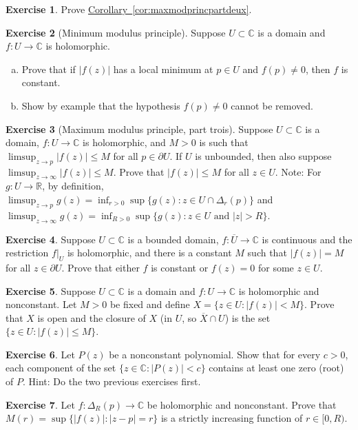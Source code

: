 \documentclass[12pt,openany]{book}
\newcommand{\widebar}[1]{\overline{#1}}
\newcommand{\sabs}[1]{\lvert {#1} \rvert}
\newcommand{\C}{{\mathbb{C}}}
\newcommand{\R}{{\mathbb{R}}}
\theoremstyle{plain}
\theoremstyle{remark}
\theoremstyle{definition}
\newenvironment{exbox}{%
    \def\FrameCommand{\vrule width 1pt \relax\hspace{10pt}}%
    \MakeFramed{\advance\hsize-\width\FrameRestore}%
}{%
    \endMakeFramed
}
\newenvironment{exparts}{%
    \leavevmode\begin{enumerate}[a),noitemsep,topsep=0pt,parsep=0pt,partopsep=0pt]
}{%
    \end{enumerate}
}
\theoremstyle{exercise}
\newtheorem{exercise}{Exercise}[section]
\theoremstyle{example}
\newcommand{\corref}[1]{\hyperref[#1]{Corollary~\ref*{#1}}}
\begin{document}
\begin{exbox}
\begin{exercise}
Prove \corref{cor:maxmodprincpartdeux}.
\end{exercise}

\begin{exercise}[Minimum modulus principle]
Suppose $U \subset \C$ is a domain and
$f \colon U \to \C$ is holomorphic.
\begin{exparts}
\item
Prove that if $\sabs{f(z)}$ has a local minimum at $p \in U$ and $f(p) \neq 0$,
then $f$ is constant.
\item
Show by example that the hypothesis
$f(p) \neq 0$ cannot be removed.
\end{exparts}
\end{exercise}

\begin{exercise}[Maximum modulus principle, part trois]
Suppose $U \subset \C$ is a domain, $f \colon U \to \C$ is holomorphic,
and $M > 0$ is such that
$\limsup_{z \to p} \sabs{f(z)} \leq M$ for all $p \in \partial U$.
If $U$ is unbounded, then also suppose
$\limsup_{z \to \infty} \sabs{f(z)} \leq M$.  Prove that
$\sabs{f(z)} \leq M$ for all $z \in U$.
Note: For $g \colon U \to \R$,
by definition,
$\limsup_{z\to p} g(z) = \inf_{r > 0} \sup \bigl\{ g(z) : z \in U
\cap \Delta_r(p) \bigr\}$ and
$\limsup_{z\to \infty} g(z) = \inf_{R > 0} \sup \bigl\{ g(z) :
z \in U \text{ and } \sabs{z} > R \bigr\}$.
\end{exercise}

\begin{exercise}
Suppose $U \subset \C$ is a bounded domain,
$f \colon \widebar{U} \to \C$ is continuous and the restriction $f|_{U}$
is holomorphic, and there is a constant $M$ such that $\sabs{f(z)} = M$
for all $z \in \partial U$.  Prove that either $f$ is constant or $f(z) = 0$
for some $z \in U$.
\end{exercise}

\begin{exercise}
Suppose $U \subset \C$ is a domain and $f \colon U \to \C$ is holomorphic
and nonconstant.
Let $M > 0$ be fixed and
define $X = \bigl\{ z \in U : \sabs{f(z)} < M \bigr\}$.
Prove that $X$ is open and the closure of $X$ (in $U$, so $\widebar{X} \cap U$) is the set
$\bigl\{ z \in U : \sabs{f(z)} \leq M \bigr\}$.
\end{exercise}

\begin{exercise}
Let $P(z)$ be a nonconstant polynomial.  Show that for every $c > 0$,
each component of the set $\bigl\{ z \in \C : \sabs{P(z)} < c \bigr\}$
contains at least one zero (root) of $P$.  Hint: Do the two previous
exercises first.
\end{exercise}

\begin{exercise}
Let $f \colon \Delta_R(p) \to \C$ be holomorphic and nonconstant.
Prove that $M(r) = \sup \bigl\{ \sabs{f(z)} : \sabs{z-p}=r \bigr\}$
is a strictly increasing function of $r \in [0,R)$.
\end{exercise}
\end{exbox}
\end{document}
